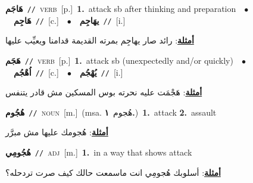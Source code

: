 \documentclass[10pt,a4paper,twoside]{article} %
\begin{document}
\begin{multicols}{2}
{\setlength\topsep{0pt}\textbf{\foreignlanguage{arabic}{هَاجَم}}\ {\color{gray}\texttt{//}\color{black}}\ \textsc{verb}\ [p.]\ \textbf{1.}~attack sb after thinking and preparation\ \ $\bullet$\ \ \setlength\topsep{0pt}\textbf{\foreignlanguage{arabic}{هَاجِم}}\ {\color{gray}\texttt{//}\color{black}}\ [c.]\ \ $\bullet$\ \ \setlength\topsep{0pt}\textbf{\foreignlanguage{arabic}{يهَاجِم}}\ {\color{gray}\texttt{//}\color{black}}\ [i.]\  \begin{flushright}\color{gray}\foreignlanguage{arabic}{\textbf{\underline{\foreignlanguage{arabic}{أمثلة}}}: رائد صار يهاجِم بمرته القديمة قدامنا  ويعيِّب عليها}\end{flushright}\color{black}} \vspace{2mm}

{\setlength\topsep{0pt}\textbf{\foreignlanguage{arabic}{هَجَم}}\ {\color{gray}\texttt{//}\color{black}}\ \textsc{verb}\ [p.]\ \textbf{1.}~attack sb (unexpectedly and/or quickly)\ \ $\bullet$\ \ \setlength\topsep{0pt}\textbf{\foreignlanguage{arabic}{اُهْجُم}}\ {\color{gray}\texttt{//}\color{black}}\ [c.]\ \ $\bullet$\ \ \setlength\topsep{0pt}\textbf{\foreignlanguage{arabic}{يُهْجُم}}\ {\color{gray}\texttt{//}\color{black}}\ [i.]\  \begin{flushright}\color{gray}\foreignlanguage{arabic}{\textbf{\underline{\foreignlanguage{arabic}{أمثلة}}}: هَجْمَت عليه نحرته بوس المسكين مش قادر يتنفس}\end{flushright}\color{black}} \vspace{2mm}

{\setlength\topsep{0pt}\textbf{\foreignlanguage{arabic}{هُجُوم}}\ {\color{gray}\texttt{//}\color{black}}\ \textsc{noun}\ [m.]\ \color{gray}(msa. \foreignlanguage{arabic}{هُجوم}~\foreignlanguage{arabic}{\textbf{١.}})\color{black}\ \textbf{1.}~attack  \textbf{2.}~assault\  \begin{flushright}\color{gray}\foreignlanguage{arabic}{\textbf{\underline{\foreignlanguage{arabic}{أمثلة}}}: هُجومك عليها مش مبرَّر}\end{flushright}\color{black}} \vspace{2mm}

{\setlength\topsep{0pt}\textbf{\foreignlanguage{arabic}{هُجُومِي}}\ {\color{gray}\texttt{//}\color{black}}\ \textsc{adj}\ [m.]\ \textbf{1.}~in a way that shows attack\  \begin{flushright}\color{gray}\foreignlanguage{arabic}{\textbf{\underline{\foreignlanguage{arabic}{أمثلة}}}: أسلوبك هُجومِي انت ماسمعت حالك كيف صرت تردحله؟}\end{flushright}\color{black}} \vspace{2mm}


\end{multicols}
\end{document}
